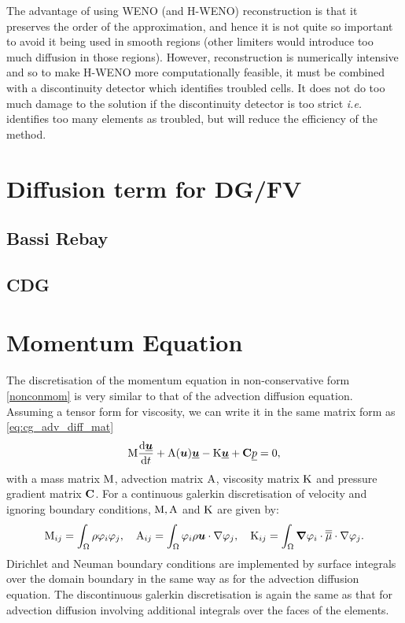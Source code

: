 The advantage of using WENO (and H-WENO) reconstruction is that it
preserves the order of the approximation, and hence it is not quite so
important to avoid it being used in smooth regions (other limiters
would introduce too much diffusion in those regions). However,
reconstruction is numerically intensive and so to make H-WENO more
computationally feasible, it must be combined with a discontinuity
detector which identifies troubled cells. It does not do too much
damage to the solution if the discontinuity detector is too strict
\emph{i.e.}  identifies too many elements as troubled, but will reduce
the efficiency of the method. 

\section{Diffusion term for DG/FV}\label{sec:NM_DG_diffusion}
\subsection{Bassi Rebay}
\label{BassiRebay}
\subsection{CDG}

\section{Momentum Equation}
\label{Sect:ND_momentum_equation}
The discretisation of the momentum equation in non-conservative 
form \eqref{nonconmom} is very similar to that of the advection 
diffusion equation. Assuming a tensor form for viscosity, we 
can write it in the same matrix form as
\eqref{eq:cg_adv_diff_mat}
\begin{equation}\label{eq:momentum_equation}
  \mathrm{M} \frac{\mathrm{d}\underline{{\mbox{\boldmath$u$}}}}{\mathrm{d} t}
    +\mathrm{A}({\mbox{\boldmath$u$}})\underline{{\mbox{\boldmath$u$}}}-\mathrm{K}\underline{{\mbox{\boldmath$u$}}}
    +{\mbox{\boldmath$\mathrm{C}$}} \underline{p}
    =0,
\end{equation}
with a mass matrix $\mathrm{M}$, advection matrix $\mathrm{A}$,
viscosity matrix $\mathrm{K}$ and pressure gradient matrix ${\mbox{\boldmath$\mathrm{C}$}}$.
For a continuous galerkin discretisation of 
velocity and ignoring boundary conditions, $\mathrm{M}, \mathrm{A}$ and $\mathrm{K}$
are given by:
\begin{equation*}
  \mathrm{M}_{ij}=\int_\Omega \rho\varphi_i\varphi_j, \quad
  \mathrm{A}_{ij}=\int_\Omega \varphi_i\rho{\mbox{\boldmath$u$}}\cdot\nabla \varphi_j, \quad
  \mathrm{K}_{ij}=\int_\Omega {\mbox{\boldmath$\nabla$}}\varphi_i\cdot \overline{\overline{\mu}}\cdot\nabla \varphi_j.
\end{equation*}
Dirichlet and Neuman boundary conditions are implemented by 
surface integrals over the domain boundary in the same way 
as for the advection diffusion equation. The discontinuous galerkin
discretisation is again the same as that for advection diffusion 
involving additional integrals over the faces of the elements.

